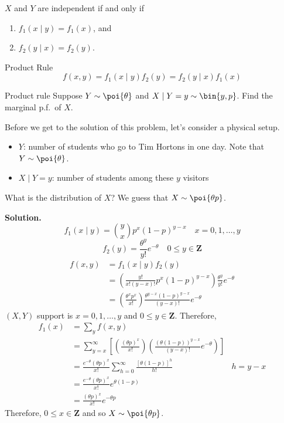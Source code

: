 \begin{Theorem}{}{}
    $ X $ and $ Y $ are independent if and only if
    \begin{enumerate}[label=(\arabic*)]
        \item $ f_1(x\mid y)=f_1(x) $, and
        \item $ f_2(y\mid x)=f_2(y) $.
    \end{enumerate}
\end{Theorem}
\begin{Theorem}{Product Rule}{}
    \[ f(x,y)=f_1(x\mid y)f_2(y)=f_2(y\mid x)f_1(x)  \]
\end{Theorem}
\begin{Example}{Product rule}{}
    Suppose $ Y \sim \poi{\theta} $ and $ X\mid Y=y \sim \bin{y,p} $.
    Find the marginal p.f.\ of $ X $.

    Before we get to the solution of this problem, let's consider a physical setup.
    \begin{itemize}
        \item $ Y $: number of students who go to Tim Hortons
              in one day. Note that $ Y \sim \poi{\theta} $.
        \item $ X\mid Y=y $: number of students among
              these $ y $ visitors
    \end{itemize}
    What is the distribution of $ X $? We guess that $ X \sim \poi{\theta p} $.

    \textbf{Solution.}
    \[ f_1(x\mid y)=\binom{y}{x}p^x (1-p)^{y-x}\quad x=0,1,\ldots,y \]
    \[ f_2(y)=\frac{\theta^y}{y!}e^{-\theta}\quad 0\le y\in\mathbf{Z}  \]
    \begin{align*}
        f(x,y)
         & =f_1(x\mid y)f_2(y)                                                                        \\
         & =\left( \frac{y!}{x!(y-x)!}p^x(1-p)^{y-x} \right)\frac{\theta^y}{y!} e^{-\theta}           \\
         & =\left( \frac{\theta^x p^x}{x!}  \right)\frac{\theta^{y-x}(1-p)^{y-x}}{(y-x)!} e^{-\theta}
    \end{align*}
    $ (X,Y) $ support is $ x=0,1,\ldots,y $ and $ 0\le y\in\mathbf{Z} $. Therefore,
    \begin{align*}
        f_1(x)
         & =\sum_{y}f(x,y)                                                                                                 \\
         & =\sum_{y=x}^{\infty}
        \left[ \left( \frac{(\theta p)^x}{x!} \right)\left( \frac{(\theta(1-p))^{y-x}}{(y-x)!} e^{-\theta} \right) \right] \\
         & =\frac{e^{-\theta} (\theta p)^x}{x!} \sum_{h=0}^{\infty} \frac{\left[ \theta(1-p) \right]^h}{h!} & h=y-x        \\
         & =\frac{e^{-\theta} (\theta p)^x}{x!}e^{\theta(1-p)}                                                             \\
         & =\frac{(\theta p)^x}{x!}e^{-\theta p}
    \end{align*}
    Therefore, $ 0\le x\in\mathbf{Z} $ and so $ X \sim \poi{\theta p} $.
\end{Example}
